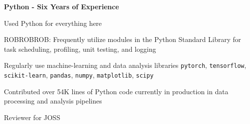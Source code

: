 
\vspace{-0.4cm}

\begin{cventries}
  \cventry
    {\textbf{Python - Six Years of Experience}} %
    {} %
    {} %
    {} %
    {
    \begin{cvitems}
    \vspace{-0.1cm}
    \item{Used Python for everything here}
    \item {ROBROBROB: Frequently utilize modules in the Python Standard Library for task scheduling, profiling, unit testing, and logging}
        \item {Regularly use machine-learning and data analysis libraries \texttt{pytorch}, \texttt{tensorflow}, \texttt{scikit-learn}, \texttt{pandas}, \texttt{numpy}, \texttt{matplotlib}, \texttt{scipy}}
        \item {Contributed over 54K lines of Python code currently in production in data processing and analysis pipelines}
        \item{Reviewer for JOSS}
    \end{cvitems}
    }

\end{cventries}



